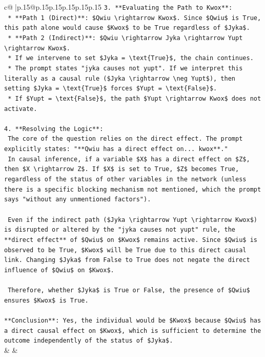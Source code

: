\documentclass{article}
\begin{document}
{\begin{supertabular}{c@{$\;$}|p{.15\linewidth}@{}p{.15\linewidth}p{.15\linewidth}p{.15\linewidth}p{.15\linewidth}p{.15\linewidth}}
{{{\texttt{3.  **Evaluating the Path to Kwox**:} \\
\texttt{    *   **Path 1 (Direct)**: \$Qwiu \textbackslash{}rightarrow Kwox\$. Since \$Qwiu\$ is True, this path alone would cause \$Kwox\$ to be True regardless of \$Jyka\$.} \\
\texttt{    *   **Path 2 (Indirect)**: \$Qwiu \textbackslash{}rightarrow Jyka \textbackslash{}rightarrow Yupt \textbackslash{}rightarrow Kwox\$.} \\
\texttt{        *   If we intervene to set \$Jyka = \textbackslash{}text\{True\}\$, the chain continues.} \\
\texttt{        *   The prompt states "jyka causes not yupt". If we interpret this literally as a causal rule (\$Jyka \textbackslash{}rightarrow \textbackslash{}neg Yupt\$), then setting \$Jyka = \textbackslash{}text\{True\}\$ forces \$Yupt = \textbackslash{}text\{False\}\$.} \\
\texttt{        *   If \$Yupt = \textbackslash{}text\{False\}\$, the path \$Yupt \textbackslash{}rightarrow Kwox\$ does not activate.} \\
\\ 
\texttt{4.  **Resolving the Logic**:} \\
\texttt{    The core of the question relies on the direct effect. The prompt explicitly states: "**Qwiu has a direct effect on... kwox**."} \\
\texttt{    In causal inference, if a variable \$X\$ has a direct effect on \$Z\$, then \$X \textbackslash{}rightarrow Z\$. If \$X\$ is set to True, \$Z\$ becomes True, regardless of the status of other variables in the network (unless there is a specific blocking mechanism not mentioned, which the prompt says "without any unmentioned factors").} \\
\\ 
\texttt{    Even if the indirect path (\$Jyka \textbackslash{}rightarrow Yupt \textbackslash{}rightarrow Kwox\$) is disrupted or altered by the "jyka causes not yupt" rule, the **direct effect** of \$Qwiu\$ on \$Kwox\$ remains active. Since \$Qwiu\$ is observed to be True, \$Kwox\$ will be True due to this direct causal link. Changing \$Jyka\$ from False to True does not negate the direct influence of \$Qwiu\$ on \$Kwox\$.} \\
\\ 
\texttt{    Therefore, whether \$Jyka\$ is True or False, the presence of \$Qwiu\$ ensures \$Kwox\$ is True.} \\
\\ 
\texttt{**Conclusion**: Yes, the individual would be \$Kwox\$ because \$Qwiu\$ has a direct causal effect on \$Kwox\$, which is sufficient to determine the outcome independently of the status of \$Jyka\$.} \\
            }
        }
    }
    & & \\ \\


\end{supertabular}}
\end{document}
